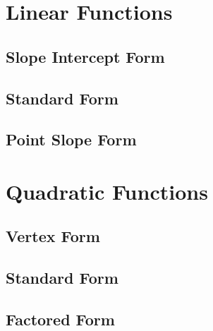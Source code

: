 \documentclass[10pt]{article}
\begin{document}
\section{Linear Functions}
	\subsection{Slope Intercept Form}
	\subsection{Standard Form}
	\subsection{Point Slope Form}

\section{Quadratic Functions}
	\subsection{Vertex Form}
	\subsection{Standard Form}
	\subsection{Factored Form}
\end{document}
